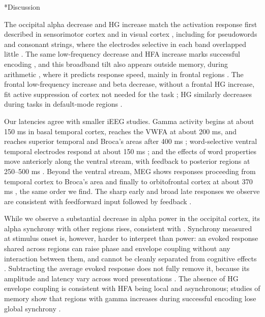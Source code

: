 \documentclass[10pt,twocolumn]{article}  %
\makeatletter
\renewcommand\section{\@startsection{section}{1}{\z@}{-10pt plus -2pt minus -1pt}{4pt}{\raggedright\sffamily\bfseries\large}}
\makeatother
\begin{document}
\section*{Discussion}\label{discussion}

The occipital alpha decrease and HG increase match the activation response first described in sensorimotor cortex \citep{Crone_1998a,Crone_1998b} and in visual cortex \citep{Lachaux_2005}, including for pseudowords and consonant strings, where the electrodes selective in each band overlapped little \citep{Vidal_2010}. The same low-frequency decrease and HFA increase marks successful encoding \citep{Sederberg_2003,Long_2014}, and this broadband tilt also appears outside memory, during arithmetic \citep{Randazzo_2019}, where it predicts response speed, mainly in frontal regions \citep{DeHaan_2025}. The frontal low-frequency increase and beta decrease, without a frontal HG increase, fit active suppression of cortex not needed for the task \citep{Jensen_2010}; HG similarly decreases during tasks in default-mode regions \citep{Ossand_n_2011}.

Our latencies agree with smaller iEEG studies. Gamma activity begins at about 150 ms in basal temporal cortex, reaches the VWFA at about 200 ms, and reaches superior temporal and Broca's areas after 400 ms \citep{Mainy_2007}; word-selective ventral temporal electrodes respond at about 150 ms \citep{Kadipasaoglu_2016}; and the effects of word properties move anteriorly along the ventral stream, with feedback to posterior regions at 250--500 ms \citep{Woolnough_2020}. Beyond the ventral stream, MEG shows responses proceeding from temporal cortex to Broca's area and finally to orbitofrontal cortex at about 370 ms \citep{Halgren_2002}, the same order we find. The sharp early and broad late responses we observe are consistent with feedforward input followed by feedback \citep{Halgren_2006,Ghuman_2014}.

While we observe a substantial decrease in alpha power in the occipital cortex, its alpha synchrony with other regions rises, consistent with \citep{Hanslmayr_2016}. Synchrony measured at stimulus onset is, however, harder to interpret than power: an evoked response shared across regions can raise phase and envelope coupling without any interaction between them, and cannot be cleanly separated from cognitive effects \citealp{David_2006,Shah_2004}. Subtracting the average evoked response does not fully remove it, because its amplitude and latency vary across word presentations \citep{Truccolo_2002,David_2006}. The absence of HG envelope coupling is consistent with HFA being local and asynchronous; studies of memory show that regions with gamma increases during successful encoding lose global synchrony \citep{Burke_2013}. 
\end{document}
